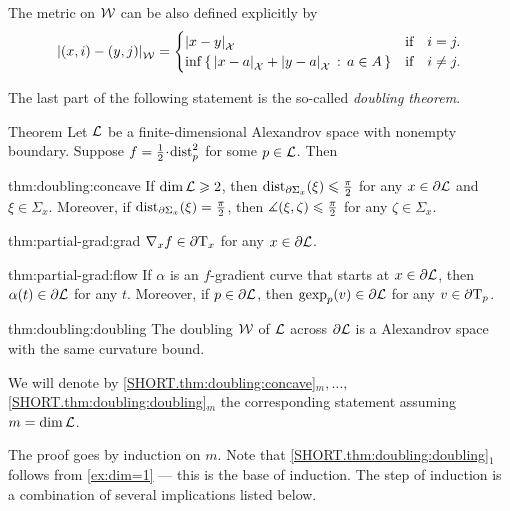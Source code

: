 The metric on $\mathcal{W}$ can be also defined explicitly by
\[\dist{(x,i)}{(y,j)}{\spc{W}}=
\begin{cases}
\dist{x}{y}{\spc{X}}&\text{if}\quad i= j.
\\
\inf\set{\dist{x}{a}{\spc{X}}+\dist{y}{a}{\spc{X}}}{a\in A}&\text{if}\quad i\ne j.
\end{cases}
\]

The last part of the following statement is the so-called \emph{doubling theorem}.

\begin{thm}{Theorem}\label{thm:doubling}
Let $\mathcal{L}$ be a finite-dimensional Alexandrov space with nonempty boundary.
Suppose $f\z=\tfrac12\cdot\distfun_p^2$ for some $p\in \mathcal{L}$.
Then

\begin{subthm}{thm:doubling:concave}
If $\operatorname{\rm dim}\nolimits \mathcal{L}\geqslant 2$, then
$\mathrm{dist}_{\partial \Sigma_x}(\xi)\leqslant \tfrac\pi2$ for any $x\in\partial \mathcal{L}$ and $\xi\in \Sigma_x$.
Moreover, if $\mathrm{dist}_{\partial \Sigma_x}(\xi)= \tfrac\pi2$, then $\measuredangle(\xi,\zeta)\leqslant\tfrac\pi2$ for any $\zeta\in \Sigma_x$. 
\end{subthm}

\begin{subthm}{thm:partial-grad:grad}
$\nabla_xf\in \partial\mathrm{T}_x$ for any $x\in\partial \mathcal{L}$.
\end{subthm}

\begin{subthm}{thm:partial-grad:flow}
If $\alpha$ is an $f$-gradient curve that starts at $x\in \partial \mathcal{L}$, then $\alpha(t)\in \partial \mathcal{L}$ for any $t$.
Moreover, if $p\in \partial \mathcal{L}$, then $\operatorname{\rm gexp}\nolimits_p(v)\in \partial \mathcal{L}$ for any $v\in\partial\mathrm{T}_p$.
\end{subthm}

\begin{subthm}{thm:doubling:doubling}
The doubling $\mathcal{W}$ of $\mathcal{L}$ across $\partial \mathcal{L}$ is a Alexandrov space with the same curvature bound.
\end{subthm}

\end{thm}

We will denote by 
\ref{SHORT.thm:doubling:concave}$_m,\dots,$\ref{SHORT.thm:doubling:doubling}$_m$ the corresponding statement assuming $m=\operatorname{\rm dim}\nolimits\mathcal{L}$.

The proof goes by induction on $m$.
Note that \ref{SHORT.thm:doubling:doubling}$_1$ follows from \ref{ex:dim=1} --- this is the base of induction.
The step of induction is a combination of several implications listed below.

